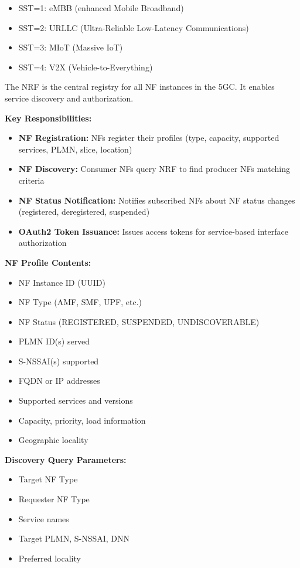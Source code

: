 \begin{itemize}
\tightlist
\item
  SST=1: eMBB (enhanced Mobile Broadband)
\item
  SST=2: URLLC (Ultra-Reliable Low-Latency Communications)
\item
  SST=3: MIoT (Massive IoT)
\item
  SST=4: V2X (Vehicle-to-Everything)
\end{itemize}


The NRF is the central registry for all NF instances in the 5GC. It enables service discovery and authorization.

\textbf{Key Responsibilities:}

\begin{itemize}
\tightlist
\item
  \textbf{NF Registration:} NFs register their profiles (type, capacity, supported services, PLMN, slice, location)
\item
  \textbf{NF Discovery:} Consumer NFs query NRF to find producer NFs matching criteria
\item
  \textbf{NF Status Notification:} Notifies subscribed NFs about NF status changes (registered, deregistered, suspended)
\item
  \textbf{OAuth2 Token Issuance:} Issues access tokens for service-based interface authorization
\end{itemize}

\textbf{NF Profile Contents:}

\begin{itemize}
\tightlist
\item
  NF Instance ID (UUID)
\item
  NF Type (AMF, SMF, UPF, etc.)
\item
  NF Status (REGISTERED, SUSPENDED, UNDISCOVERABLE)
\item
  PLMN ID(s) served
\item
  S-NSSAI(s) supported
\item
  FQDN or IP addresses
\item
  Supported services and versions
\item
  Capacity, priority, load information
\item
  Geographic locality
\end{itemize}

\textbf{Discovery Query Parameters:}

\begin{itemize}
\tightlist
\item
  Target NF Type
\item
  Requester NF Type
\item
  Service names
\item
  Target PLMN, S-NSSAI, DNN
\item
  Preferred locality
\end{itemize}

